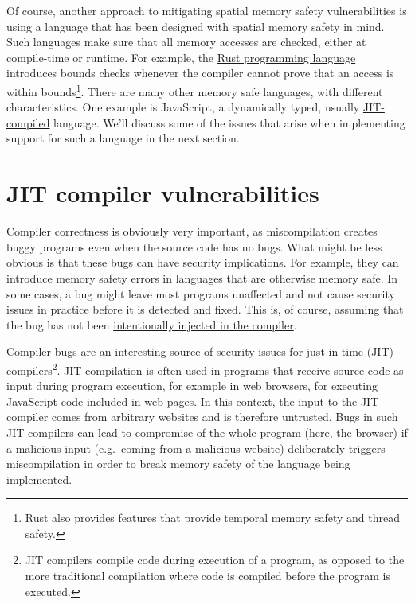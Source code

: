 \documentclass[
  a4paper,
]{report}
\begin{document}
Of course, another approach to mitigating spatial memory safety
vulnerabilities is using a language that has been designed with spatial
memory safety in mind. Such languages make sure that all memory accesses
are checked, either at compile-time or runtime. For example, the
\href{https://www.rust-lang.org/}{Rust programming language} introduces
bounds checks whenever the compiler cannot prove that an access is
within bounds\footnote{Rust also provides features that provide temporal
  memory safety and thread safety.}. There are many other memory safe
languages, with different characteristics. One example is JavaScript, a
dynamically typed, usually
\hyperref[jit-compiler-vulnerabilities]{JIT-compiled} language. We'll
discuss some of the issues that arise when implementing support for such
a language in the next section.

\section{JIT compiler
vulnerabilities}\label{sec:jit-compiler-vulnerabilities}

Compiler correctness is obviously very important, as miscompilation
creates buggy programs even when the source code has no bugs. What might
be less obvious is that these bugs can have security implications. For
example, they can introduce memory safety errors in languages that are
otherwise memory safe. In some cases, a bug might leave most programs
unaffected and not cause security issues in practice before it is
detected and fixed. This is, of course, assuming that the bug has not
been \hyperref[supply-chain-attacks]{intentionally injected in the
compiler}.

Compiler bugs are an interesting source of security issues for
\label{__index_entry_92}{\href{https://en.wikipedia.org/wiki/Just-in-time_compilation}{just-in-time
(JIT)} compilers}\footnote{JIT
  compilers compile code during execution of a program, as opposed to
  the more traditional compilation where code is compiled before the
  program is executed.}. JIT compilation is often used in programs that
receive source code as input during program execution, for example in
web browsers, for executing JavaScript code included in web pages. In
this context, the input to the JIT compiler comes from arbitrary
websites and is therefore untrusted. Bugs in such JIT compilers can lead
to compromise of the whole program (here, the browser) if a malicious
input (e.g.~coming from a malicious website) deliberately triggers
miscompilation in order to break memory safety of the language being
implemented.
\end{document}
